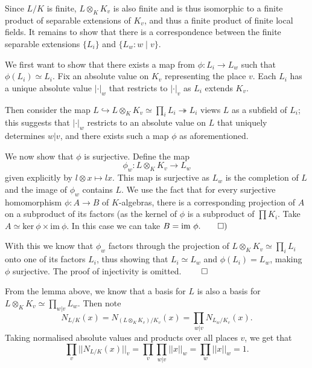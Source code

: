 \documentclass[a4paper, 12pt,oneside,openany]{book}
\begin{document}

 Since $L/K$ is finite, $L \otimes_K K_v$ is also finite and is thus isomorphic to a finite product of separable extensions of $K_v$, and thus a finite product of finite local fields. It remains to show that there is a correspondence between the finite separable extensions $\{L_i\}$ and $\{L_w: w\mid v\}.$

We first want to show that there exists a map from $\phi:L_i\to L_w$ such that $\phi(L_i) \simeq L_i.$ Fix an absolute value on $K_v$ representing the place $v$. Each $L_i$ has a unique absolute value $|\cdot |_w$ that restricts to $|\cdot|_v$ as $L_i$ extends $K_v$. 

Then consider the map $L \hookrightarrow L \otimes_K K_v \simeq \prod_i L_i \twoheadrightarrow L_i$ views $L$ as a subfield of $L_i$; this suggests that $|\cdot|_w$ restricts to an absolute value on $L$ that uniquely determines $w|v$, and there exists such a map $\phi$ as aforementioned.

We now show that $\phi$ is surjective. Define the map $$\phi_w: L \otimes_K K_v \to L_w$$ given explicitly by $l \otimes x \mapsto lx$. This map is surjective as $L_w$ is the completion of $L$ and the image of $\phi_w$ contains $L$. We use the fact that for every surjective homomorphism $\phi: A\to B$ of $K$-algebras, there is a corresponding projection of $A$ on a subproduct of its factors (as the kernel of $\phi$ is a subproduct of $\prod K_i$. Take $A\simeq \text{ker}\ \phi \times \text{im}\ \phi$. In this case we can take $B = \text{im}\ \phi. \qed )$

With this we know that $\phi_w$ factors through the projection of $L \otimes_K K_v \simeq \prod_i L_i$ onto one of its factors $L_i$, thus showing that $L_i\simeq L_w$ and $\phi(L_i)=L_w$, making $\phi$ surjective. The proof of injectivity is omitted. $\qed$

From the lemma above, we know that a basis for $L$ is also a basis for $L \otimes_K K_v \simeq \prod\limits_{w|v} L_w$. Then note $$N_{L/K}(x)= N_{(L \otimes_K K_v)/K_v}(x) = \prod\limits_{w|v} N_{L_w/K_v}(x).$$ Taking normalised absolute values and products over all places $v$, we get that $$\prod\limits_{v} ||N_{L/K}(x)||_v = \prod\limits_{v} \prod\limits_{w|v} ||x||_w = \prod\limits_w ||x||_w=1.$$ 
\end{document}
